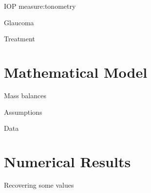 \documentclass[9pt]{beamer}
\begin{document}
\begin{frame}{IOP measure:tonometry}

\end{frame}

\begin{frame}{Glaucoma}

\end{frame}

\begin{frame}{Treatment}

\end{frame}

\section{Mathematical Model}

\begin{frame}{Mass balances}

\end{frame}

\begin{frame}{Assumptions}

\end{frame}

\begin{frame}{Data}

\end{frame}

\section{Numerical Results}

\begin{frame}{Recovering some values}

\end{frame}
\end{document}
